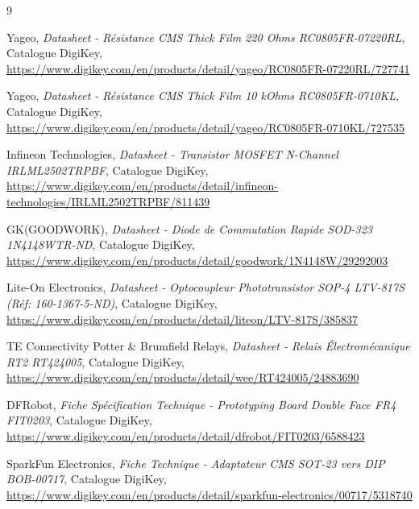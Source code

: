\documentclass[11pt,a4paper]{article}
\begin{document}
\begin{thebibliography}{9}

Yageo, \emph{Datasheet - Résistance CMS Thick Film 220 Ohms RC0805FR-07220RL}, Catalogue DigiKey, \\
\url{https://www.digikey.com/en/products/detail/yageo/RC0805FR-07220RL/727741}

Yageo, \emph{Datasheet - Résistance CMS Thick Film 10 kOhms RC0805FR-0710KL}, Catalogue DigiKey, \\
\url{https://www.digikey.com/en/products/detail/yageo/RC0805FR-0710KL/727535}

Infineon Technologies, \emph{Datasheet - Transistor MOSFET N-Channel IRLML2502TRPBF}, Catalogue DigiKey, \\
\url{https://www.digikey.com/en/products/detail/infineon-technologies/IRLML2502TRPBF/811439}

GK(GOODWORK), \emph{Datasheet - Diode de Commutation Rapide SOD-323 1N4148WTR-ND}, Catalogue DigiKey, \\
\url{https://www.digikey.com/en/products/detail/goodwork/1N4148W/29292003}

Lite-On Electronics, \emph{Datasheet - Optocoupleur Phototransistor SOP-4 LTV-817S (Réf: 160-1367-5-ND)}, Catalogue DigiKey, \\
\url{https://www.digikey.com/en/products/detail/liteon/LTV-817S/385837}

TE Connectivity Potter \& Brumfield Relays, \emph{Datasheet - Relais Électromécanique RT2 RT424005}, Catalogue DigiKey, \\
\url{https://www.digikey.com/en/products/detail/wee/RT424005/24883690}

DFRobot, \emph{Fiche Spécification Technique - Prototyping Board Double Face FR4 FIT0203}, Catalogue DigiKey, \\
\url{https://www.digikey.com/en/products/detail/dfrobot/FIT0203/6588423}

SparkFun Electronics, \emph{Fiche Technique - Adaptateur CMS SOT-23 vers DIP BOB-00717}, Catalogue DigiKey, \\
\url{https://www.digikey.com/en/products/detail/sparkfun-electronics/00717/5318740}

\end{thebibliography}
\end{document}
